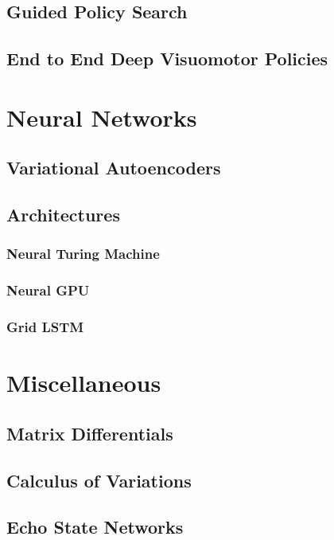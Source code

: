 \documentclass[12pt]{article}
\begin{document}
\subsection{Guided Policy Search}

\subsection{End to End Deep Visuomotor Policies}

\section{Neural Networks}

\subsection{Variational Autoencoders}

\subsection{Architectures}

\subsubsection{Neural Turing Machine}

\subsubsection{Neural GPU}

\subsubsection{Grid LSTM}

\section{Miscellaneous}

\subsection{Matrix Differentials}

\subsection{Calculus of Variations}

\subsection{Echo State Networks}
\end{document}
